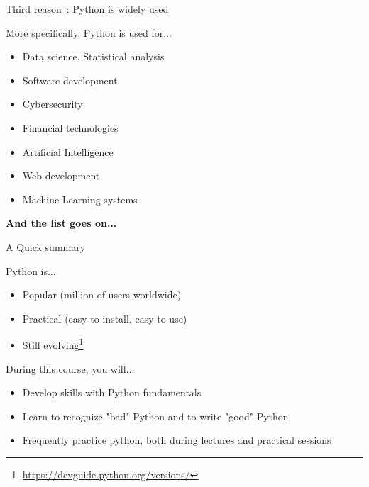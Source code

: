\documentclass[serif, aspectratio=169]{beamer}
\begin{document}
\begin{frame}{Third reason~: Python is widely used}
    \begin{block}{More specifically, Python is used for...}
        \begin{itemize}
            \item Data science, Statistical analysis
            \item Software development
            \item Cybersecurity
            \item Financial technologies
            \item Artificial Intelligence
            \item Web development
            \item Machine Learning systems
        \end{itemize}
    \end{block}
    \hfill \textbf{And the list goes on...}
\end{frame}

\begin{frame}{A Quick summary}
    \begin{block}{Python is...}
        \begin{itemize}
            \item Popular (million of users worldwide)
            \item Practical (easy to install, easy to use)
            \item Still evolving\footnote{\url{https://devguide.python.org/versions/}}
        \end{itemize}
    \end{block}
    \pause
    \begin{block}{During this course, you will...}
        \begin{itemize}
            \item Develop skills with Python fundamentals
            \item Learn to recognize "bad" Python and to write "good" Python
            \item Frequently practice python, both during lectures and practical sessions
        \end{itemize}
        
    \end{block}
\end{frame}
\end{document}
